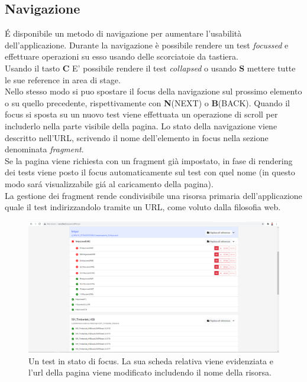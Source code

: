             \subsection{Navigazione}
                \'E disponibile un metodo di navigazione per aumentare l'usabilità dell'applicazione.
                Durante la navigazione è possibile rendere un test \textit{focussed} e effettuare operazioni su esso usando delle scorciatoie da tastiera.\\
                Usando il tasto \textbf{C} E' possibile rendere il test \textit{collapsed} o usando \textbf{S} mettere tutte le sue reference in area di stage.\\ 
                Nello stesso modo si puo spostare il focus della navigazione sul prossimo elemento o su quello precedente, rispettivamente con \textbf{N}(NEXT) o \textbf{B}(BACK).
                Quando il focus si sposta su un nuovo test viene effettuata un operazione di scroll per includerlo nella parte visibile della pagina.
                Lo stato della navigazione viene descritto nell'URL, scrivendo il nome dell'elemento in focus nella sezione denominata \textit{fragment}.\\
                Se la pagina viene richiesta con un fragment già impostato, in fase di rendering dei tests viene posto il focus automaticamente sul test con quel nome (in questo modo sar\'a visualizzabile gi\'a al caricamento della pagina).\\
                La gestione dei fragment rende condivisibile una risorsa primaria dell'applicazione quale il test indirizzandolo tramite un URL, come voluto dalla filosofia web. 
            
            \begin{figure}[h]
                \includegraphics[width=\textwidth]{images/active.png}
                \caption{Un test in stato di focus. La sua scheda relativa viene evidenziata e l'url della pagina viene modificato includendo il nome della risorsa.}
            \end{figure}
